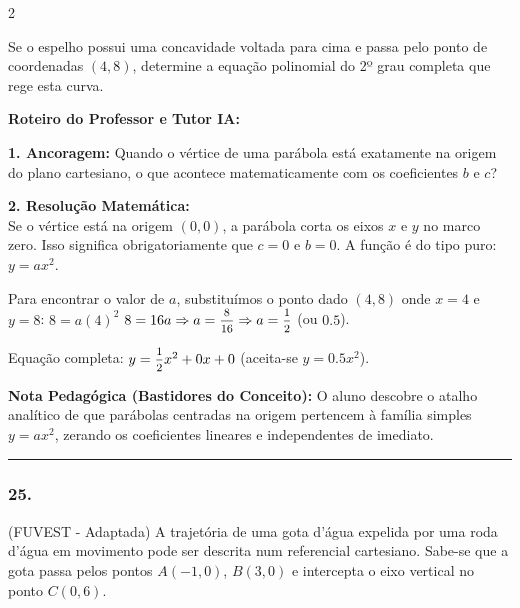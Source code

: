 \begin{multicols*}{2}
\begin{enunciadoLiteral}
Se o espelho possui uma concavidade voltada para cima e passa pelo ponto de coordenadas $(4, 8)$, determine a equação polinomial do 2º grau completa que rege esta curva. 
\end{enunciadoLiteral}

\ifgabarito
    \begin{tcolorbox}[colback=CorTitUm!5, colframe=CorTitUm, boxrule=1pt, arc=4pt, left=6pt, right=6pt, top=6pt, bottom=6pt]
    \small\textbf{\textcolor{CorTitUm}{Roteiro do Professor e Tutor IA:}}\par\vspace{0.1cm}
    \color{CinzaEscuro}
    \textbf{1. Ancoragem:} Quando o vértice de uma parábola está exatamente na origem do plano cartesiano, o que acontece matematicamente com os coeficientes $b$ e $c$?\par\vspace{0.1cm}
    \textbf{2. Resolução Matemática:}\\
    Se o vértice está na origem $(0,0)$, a parábola corta os eixos $x$ e $y$ no marco zero. Isso significa obrigatoriamente que $c = 0$ e $b = 0$.
    A função é do tipo puro: $y = ax^2$.
    
    Para encontrar o valor de $a$, substituímos o ponto dado $(4, 8)$ onde $x = 4$ e $y = 8$:
    $8 = a(4)^2$
    $8 = 16a \Rightarrow a = \mfrac{8}{16} \Rightarrow a = \mfrac{1}{2}$ (ou $0.5$).
    
    Equação completa: $y = \mfrac{1}{2}x^2 + 0x + 0$ (aceita-se $y = 0.5x^2$).
    \end{tcolorbox}
    \vspace{0.15cm}
    
    \begin{boxexplicacao}
    \textbf{Nota Pedagógica (Bastidores do Conceito):} O aluno descobre o atalho analítico de que parábolas centradas na origem pertencem à família simples $y = ax^2$, zerando os coeficientes lineares e independentes de imediato.
    \end{boxexplicacao}
\fi

\par\vspace{\espacoQuestao}

\noindent\textcolor{CorLinha}{\rule{\linewidth}{0.5pt}} 
\par\vspace{\espacoPreQuestao}
\subsubsection*{25.} 
\begin{enunciadoLiteral}
(FUVEST - Adaptada) A trajetória de uma gota d'água expelida por uma roda d'água em movimento pode ser descrita num referencial cartesiano. Sabe-se que a gota passa pelos pontos $A(-1, 0)$, $B(3, 0)$ e intercepta o eixo vertical no ponto $C(0, 6)$.


\end{enunciadoLiteral}
\end{multicols*}
